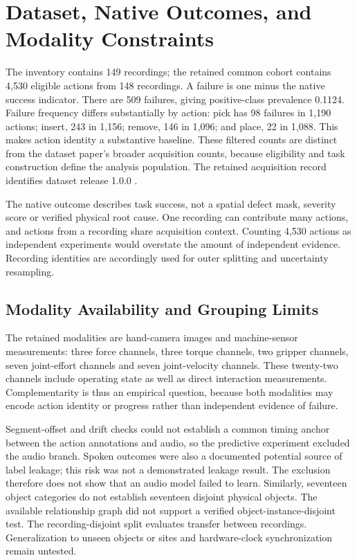 \section{Dataset, Native Outcomes, and Modality Constraints}
The inventory contains 149 recordings; the retained common cohort contains 4,530
eligible actions from 148 recordings. A failure is one minus the native success
indicator. There are 509 failures, giving positive-class prevalence 0.1124. Failure
frequency differs substantially by action: pick has 98 failures in 1,190 actions;
insert, 243 in 1,156; remove, 146 in 1,096; and place, 22 in 1,088. This makes action
identity a substantive baseline. These filtered counts are distinct from the dataset
paper's broader acquisition counts, because eligibility and task construction define the
analysis population. The retained acquisition record identifies dataset release 1.0.0
\parencite{Sliwowski2025REASSEMBLE,Sliwowski2025REASSEMBLEData}.

The native outcome describes task success, not a spatial defect mask, severity score or
verified physical root cause. One recording can contribute many actions, and actions
from a recording share acquisition context. Counting 4,530 actions as independent
experiments would overstate the amount of independent evidence. Recording identities are
accordingly used for outer splitting and uncertainty resampling.

\subsection{Modality Availability and Grouping Limits}
The retained modalities are hand-camera images and machine-sensor measurements: three
force channels, three torque channels, two gripper channels, seven joint-effort channels
and seven joint-velocity channels. These twenty-two channels include operating state as
well as direct interaction measurements. Complementarity is thus an empirical question,
because both modalities may encode action identity or progress rather than independent
evidence of failure.

Segment-offset and drift checks could not establish a common timing anchor between the
action annotations and audio, so the predictive experiment excluded the audio branch.
Spoken outcomes were also a documented potential source of label leakage; this risk was
not a demonstrated leakage result. The exclusion therefore does not show that an audio
model failed to learn. Similarly, seventeen object categories do not establish
seventeen disjoint physical objects. The available
relationship graph did not support a verified object-instance-disjoint test. The
recording-disjoint split evaluates transfer between recordings. Generalization to unseen
objects or sites and hardware-clock synchronization remain untested.

